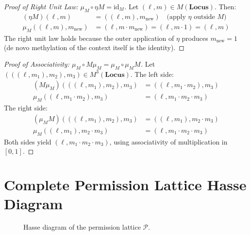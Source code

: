 \documentclass[12pt,a4paper]{article}
\newcommand{\cat}[1]{\mathbf{#1}}
\newcommand{\id}{\mathrm{id}}
\begin{document}
\begin{proof}[Proof of Right Unit Law: $\mu_M \circ \eta M = \id_M$]
Let $(\ell, m) \in M(\cat{Locus})$. Then:
\begin{align}
    (\eta M)(\ell, m) &= ((\ell, m), m_{\mathrm{new}}) \quad \text{(apply $\eta$ outside $M$)} \\
    \mu_M((\ell, m), m_{\mathrm{new}}) &= (\ell, m \cdot m_{\mathrm{new}}) = (\ell, m \cdot 1) = (\ell, m)
\end{align}
The right unit law holds because the outer application of $\eta$ produces $m_{\mathrm{new}} = 1$ (de novo methylation of the context itself is the identity).
\end{proof}

\begin{proof}[Proof of Associativity: $\mu_M \circ M\mu_M = \mu_M \circ \mu_M M$]
Let $(((\ell, m_1), m_2), m_3) \in M^3(\cat{Locus})$. The left side:
\begin{align}
    (M\mu_M)(((\ell, m_1), m_2), m_3) &= ((\ell, m_1 \cdot m_2), m_3) \\
    \mu_M((\ell, m_1 \cdot m_2), m_3) &= (\ell, m_1 \cdot m_2 \cdot m_3)
\end{align}
The right side:
\begin{align}
    (\mu_M M)(((\ell, m_1), m_2), m_3) &= ((\ell, m_1), m_2 \cdot m_3) \\
    \mu_M((\ell, m_1), m_2 \cdot m_3) &= (\ell, m_1 \cdot m_2 \cdot m_3)
\end{align}
Both sides yield $(\ell, m_1 \cdot m_2 \cdot m_3)$, using associativity of multiplication in $[0,1]$.
\end{proof}

\section{Complete Permission Lattice Hasse Diagram}
\label{app:hasse}

\begin{figure}[H]
\centering
{}
\caption{Hasse diagram of the permission lattice $\mathcal{P}$.}
\label{fig:hasse}
\end{figure}
\end{document}

